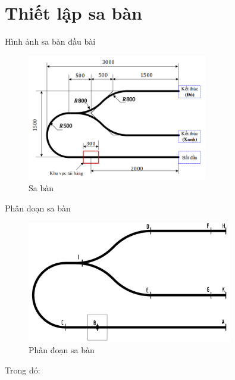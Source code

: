      \section{Thiết lập sa bàn}
          \hspace*{0.6cm}Hình ảnh sa bàn đầu bài
          \begin{figure}[H]
               \centering
               \includegraphics[width=0.7\textwidth]{pictures/chapter7/saban.png}
               \caption{Sa bàn}
               \label{race}
          \end{figure}
          Phân đoạn sa bàn
          \begin{figure}[H]
               \centering
               \includegraphics[width=0.8\textwidth]{pictures/chapter7/cut_saban.png}
               \caption{Phân đoạn sa bàn}
               \label{cut_race}
          \end{figure}
          Trong đó:
